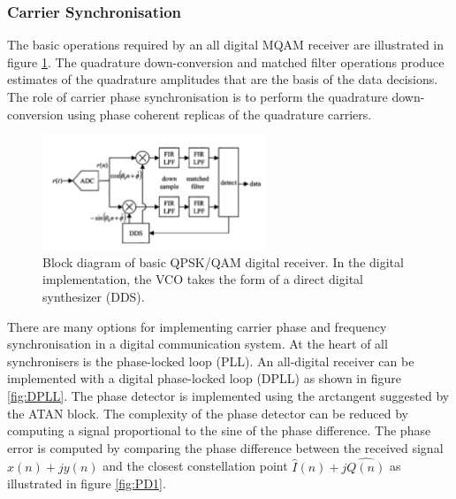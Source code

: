 \documentclass[12pt,a4paper,openright]{article}
\begin{document}
\subsubsection{Carrier Synchronisation}

The basic operations required by an all digital MQAM receiver are illustrated in figure \ref{fig:rxMQAM}. The quadrature down-conversion and matched filter operations produce estimates of the quadrature amplitudes that are the basis of the data decisions. The role of carrier phase synchronisation is to perform the quadrature down-conversion using phase coherent replicas of the quadrature carriers.

 \begin{figure}[h]
  \centering
    \includegraphics[width=0.6\textwidth]{rxMQAM.pdf}
    \caption{Block diagram of basic QPSK/QAM digital receiver. In the digital implementation, the VCO takes the form of a direct digital synthesizer (DDS). }
    \label{fig:rxMQAM}
\end{figure}

There are many options for implementing carrier phase and frequency synchronisation in a digital communication system. At the heart of all synchronisers is the phase-locked loop (PLL). An all-digital receiver can be implemented with a digital phase-locked loop (DPLL) as shown in figure \ref{fig:DPLL}. The phase detector is implemented using the arctangent suggested by the ATAN block. The complexity of the phase detector can be reduced by computing a signal proportional to the sine of the phase difference. The phase error is computed by comparing the phase difference between the received signal $x(n) + jy(n)$ and the closest constellation point $\hat{I}(n) + j\hat{Q(n)}$ as illustrated in figure \ref{fig:PD1}.
\end{document}
